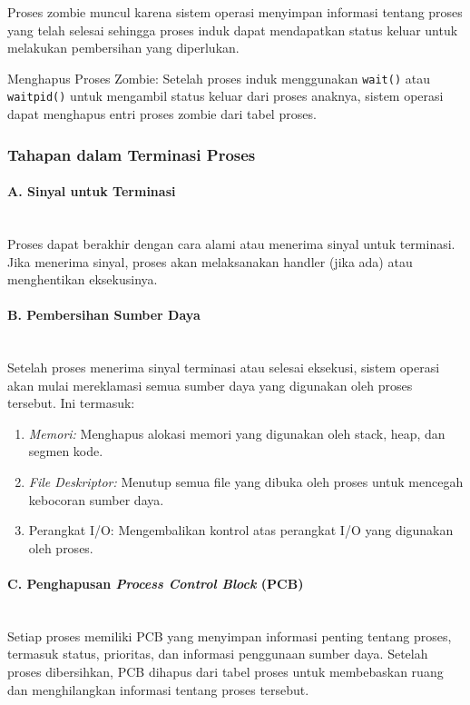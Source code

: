 \documentclass[12pt]{article}
\begin{document}
\begin{itemize}
    Proses zombie muncul karena sistem operasi menyimpan informasi tentang proses yang telah selesai sehingga proses induk dapat mendapatkan status keluar untuk melakukan pembersihan yang diperlukan.

    Menghapus Proses Zombie:
    Setelah proses induk menggunakan \texttt{wait()} atau \texttt{waitpid()} untuk mengambil status keluar dari proses anaknya, sistem operasi dapat menghapus entri proses zombie dari tabel proses.

    \subsubsection{Tahapan dalam Terminasi Proses}

    \paragraph{A. Sinyal untuk Terminasi}\mbox{}\\
    Proses dapat berakhir dengan cara alami atau menerima sinyal untuk terminasi. Jika menerima sinyal, proses akan melaksanakan handler (jika ada) atau menghentikan eksekusinya.
        
    \paragraph{B. Pembersihan Sumber Daya} \mbox{} \\
    Setelah proses menerima sinyal terminasi atau selesai eksekusi, sistem operasi akan mulai mereklamasi semua sumber daya yang digunakan oleh proses tersebut. Ini termasuk:
    \begin{enumerate}
        \item \textit{Memori:} Menghapus alokasi memori yang digunakan oleh stack, heap, dan segmen kode.
        \item \textit{File Deskriptor:} Menutup semua file yang dibuka oleh proses untuk mencegah kebocoran sumber daya.
        \item Perangkat I/O: Mengembalikan kontrol atas perangkat I/O yang digunakan oleh proses.
    \end{enumerate}
        
    \paragraph{C. Penghapusan \textit{Process Control Block} (PCB)}  
    \mbox{}\\ Setiap proses memiliki PCB yang menyimpan informasi penting tentang proses, termasuk status, prioritas, dan informasi penggunaan sumber daya. Setelah proses dibersihkan, PCB dihapus dari tabel proses untuk membebaskan ruang dan menghilangkan informasi tentang proses tersebut.
        

\end{itemize}
\end{document}
